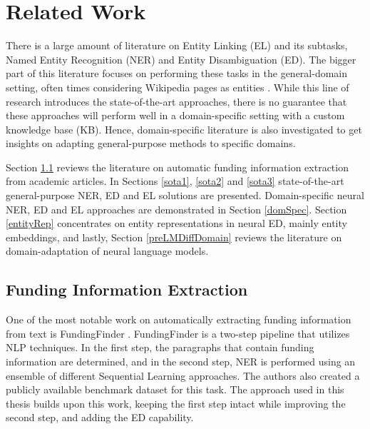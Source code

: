 \documentclass{report}
\theoremstyle{definition}
\theoremstyle{remark}
\begin{document}
\chapter{Related Work}
\label{chap:rw}
There is a large amount of literature on Entity Linking (EL) and its subtasks, Named Entity Recognition (NER) and Entity Disambiguation (ED). The bigger part of this literature focuses on performing these tasks in the general-domain setting, often times considering Wikipedia pages as entities \cite{nlpnotes}. While this line of research introduces the state-of-the-art approaches, there is no guarantee that these approaches will perform well in a domain-specific setting with a custom knowledge base (KB). Hence, domain-specific literature is also investigated to get insights on adapting general-purpose methods to specific domains.

Section \ref{FundingDataExtraction} reviews the literature on automatic funding information extraction from academic articles. In Sections \ref{sota1}, \ref{sota2} and \ref{sota3} state-of-the-art general-purpose NER, ED and EL solutions are presented. Domain-specific neural NER, ED and EL approaches are demonstrated in Section \ref{domSpec}. Section \ref{entityRep} concentrates on entity representations in neural ED, mainly entity embeddings, and lastly, Section \ref{preLMDiffDomain} reviews the literature on domain-adaptation of neural language models.

\section{Funding Information Extraction}
\label{FundingDataExtraction}

    One of the most notable work on automatically extracting funding information from text is FundingFinder \cite{ElsPaper}. FundingFinder is a two-step pipeline that utilizes NLP techniques. In the first step, the paragraphs that contain funding information are determined, and in the second step, NER is performed using an ensemble of different Sequential Learning approaches. The authors also created a publicly available benchmark dataset for this task. The approach used in this thesis builds upon this work, keeping the first step intact while improving the second step, and adding the ED capability. 
    
\end{document}
